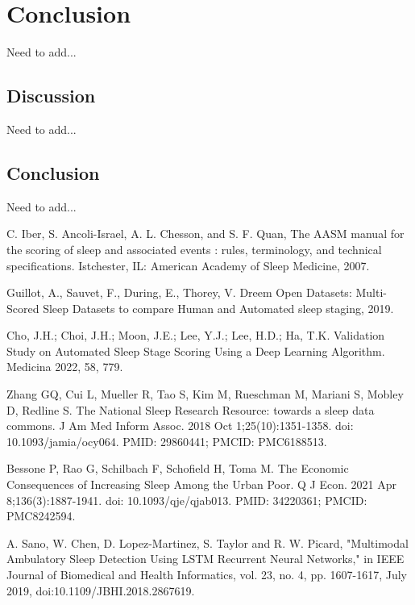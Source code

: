 \documentclass[12pt]{report}
\begin{document}
\chapter{Conclusion}
Need to add...

\section{Discussion}
Need to add...

\section{Conclusion}
Need to add...

\begin{thebibliography}{99}
\newcommand{\AmS}{$${\protect\the\textfont2 A}\kern-.1667em\lower
         .5ex\hbox{\protect\the\textfont2 M}\kern
         -.125em{\protect\the\textfont2 S}}

 C. Iber, S. Ancoli-Israel, A. L. Chesson, and S. F. Quan, The AASM manual for the scoring of sleep and associated events : rules, terminology, and technical specifications. Istchester, IL: American Academy of Sleep Medicine, 2007.

 Guillot, A., Sauvet, F., During, E., Thorey, V. Dreem Open Datasets: Multi-Scored Sleep Datasets to compare Human and Automated sleep staging, 2019.

 Cho, J.H.; Choi, J.H.; Moon, J.E.; Lee, Y.J.; Lee, H.D.; Ha, T.K. Validation Study on Automated Sleep Stage Scoring Using a Deep Learning Algorithm. Medicina 2022, 58, 779.

 Zhang GQ, Cui L, Mueller R, Tao S, Kim M, Rueschman M, Mariani S, Mobley D, Redline S. The National Sleep Research Resource: towards a sleep data commons. J Am Med Inform Assoc. 2018 Oct 1;25(10):1351-1358. doi: 10.1093/jamia/ocy064. PMID: 29860441; PMCID: PMC6188513.

 Bessone P, Rao G, Schilbach F, Schofield H, Toma M. The Economic Consequences of Increasing Sleep Among the Urban Poor. Q J Econ. 2021 Apr 8;136(3):1887-1941. doi: 10.1093/qje/qjab013. PMID: 34220361; PMCID: PMC8242594.

 A. Sano, W. Chen, D. Lopez-Martinez, S. Taylor and R. W. Picard, "Multimodal Ambulatory Sleep Detection Using LSTM Recurrent Neural Networks," in IEEE Journal of Biomedical and Health Informatics, vol. 23, no. 4, pp. 1607-1617, July 2019, doi:10.1109/JBHI.2018.2867619.


\end{thebibliography}
\end{document}
